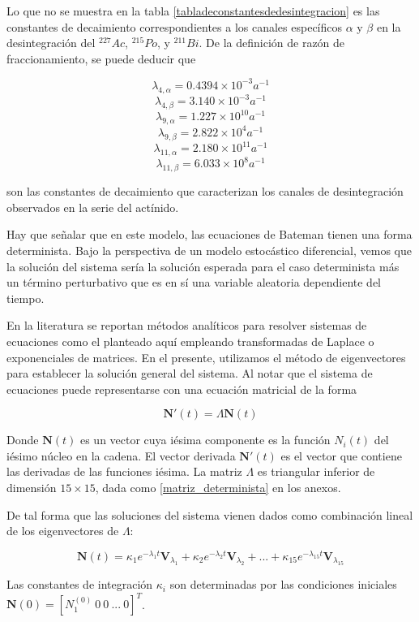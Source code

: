 Lo que no se muestra en la tabla \ref{tabladeconstantesdedesintegracion} es las constantes de decaimiento correspondientes a los canales específicos $\alpha$ y $\beta$ en la desintegración del $^227 Ac$, $^215 Po$, y $^211 Bi$. De la definición de razón de fraccionamiento, se puede deducir que

$$\lambda_{4,\alpha}=0.4394\times 10^{-3}\unit{a^{-1}}$$
$$\lambda_{4,\beta}=3.140\times 10^{-3}\unit{a^{-1}}$$
$$\lambda_{9,\alpha}=1.227\times 10^{10}\unit{a^{-1}}$$
$$\lambda_{9,\beta}=2.822\times 10^{4}\unit{a^{-1}}$$
$$\lambda_{11,\alpha}=2.180\times 10^{11}\unit{a^{-1}}$$
$$\lambda_{11,\beta}=6.033\times 10^{8}\unit{a^{-1}}$$

\noindent son las constantes de decaimiento que caracterizan los canales de desintegración observados en la serie del actínido. 

Hay que señalar que en este modelo, las ecuaciones de Bateman tienen una forma determinista. Bajo la perspectiva de un modelo estocástico diferencial, vemos que la solución del sistema sería la solución esperada para el caso determinista más un término perturbativo que es en sí una variable aleatoria dependiente del tiempo. 

En la literatura se reportan métodos analíticos para resolver sistemas de ecuaciones como el planteado aquí empleando transformadas de Laplace o exponenciales de matrices. En el presente, utilizamos el método de eigenvectores para establecer la solución general del sistema. Al notar que el sistema de ecuaciones puede representarse con una ecuación matricial de la forma

$$\mathbf{N'}(t)=\Lambda \mathbf{N}(t)$$

Donde $\mathbf{N}(t)$ es un vector cuya iésima componente es la función $N_i(t)$ del iésimo núcleo en la cadena. El vector derivada $\mathbf{N'}(t)$ es el vector que contiene las derivadas de las funciones iésima. La matriz $\Lambda$ es triangular inferior de dimensión $15\times15$, dada como \ref{matriz_determinista} en los anexos.

De tal forma que las soluciones del sistema vienen dados como combinación lineal de los eigenvectores de $\Lambda$:

$$\mathbf{N}(t)=\kappa_1 e^{-\lambda_1 t} \mathbf{V}_{\lambda_1}+\kappa_2 e^{-\lambda_2 t} \mathbf{V}_{\lambda_2}+...+\kappa_{15} e^{-\lambda_{15} t} \mathbf{V}_{\lambda_{15}}$$

\noindent Las constantes de integración $\kappa_i$ son determinadas por las condiciones iniciales $\mathbf{N}(0)=\left[N_1^{(0)}\ 0\ 0\ ...\ 0\right]^T$.

